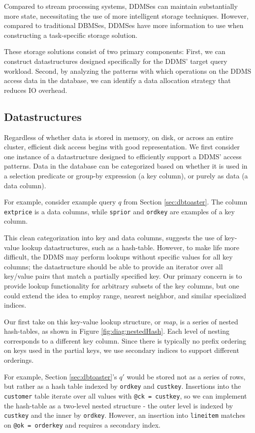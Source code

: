 Compared to stream processing systems, DDMSes can maintain substantially more state, necessitating the use of more intelligent storage techniques.  However, compared to traditional DBMSes, DDMSes have more information to use when constructing a task-specific storage solution.  

These storage solutions consist of two primary components: First, we can construct datastructures designed specifically for the DDMS' target query workload.  Second, by analyzing the patterns with which operations on the DDMS access data in the database, we can identify a data allocation strategy that reduces IO overhead.

\subsection{Datastructures}
Regardless of whether data is stored in memory, on disk, or across an entire cluster, efficient disk access begins with good representation.  We first consider one instance of a datastructure designed to efficiently support a DDMS' access patterns.  Data in the database can be categorized based on whether it is used in a selection predicate or group-by expression (a key column), or purely as data (a data column).  

For example, consider example query $q$ from Section \ref{sec:dbtoaster}.  The column \texttt{extprice} is a data columns, while \texttt{sprior} and \texttt{ordkey} are examples of a key column.  

This clean categorization into key and data columns, suggests the use of key-value lookup datastructures, such as a hash-table.  However, to make life more difficult, the DDMS may perform lookups without specific values for all key columns; the datastructure should be able to provide an iterator over all key/value pairs that match a partially specified key.  Our primary concern is to provide lookup functionality for arbitrary subsets of the key columns, but one could extend the idea to employ range, nearest neighbor, and similar specialized indices.  

Our first take on this key-value lookup structure, or \textit{map}, is a series of nested hash-tables, as shown in Figure \ref{fig:diag:nestedHash}.  Each level of nesting corresponds to a different key column.  Since there is typically no prefix ordering on keys used in the partial keys, we use secondary indices to support different orderings.

For example, Section \ref{sec:dbtoaster}'s $q'$ would be stored not as a series of rows, but rather as a hash table indexed by \texttt{ordkey} and \texttt{custkey}.  Insertions into the \texttt{customer} table iterate over all values with \texttt{@ck = custkey}, so we can implement the hash-table as a two-level nested structure - the outer level is indexed by \texttt{custkey} and the inner by \texttt{ordkey}.  However, an insertion into \texttt{lineitem} matches on \texttt{@ok = orderkey} and requires a secondary index.  

